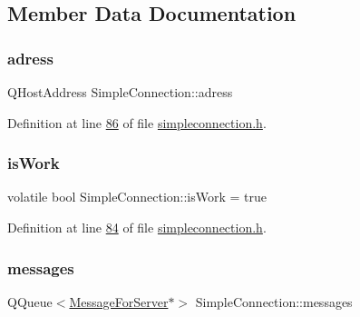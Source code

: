 \subsection{Member Data Documentation}
\mbox{\label{a00125_afd0b4e345d57b690f1a1e12c4816e268}} 
\subsubsection{\texorpdfstring{adress}{adress}}
{\footnotesize\ttfamily Q\+Host\+Address Simple\+Connection\+::adress\hspace{0.3cm}{\ttfamily [protected]}}



Definition at line \hyperlink{a00008_source_l00086}{86} of file \hyperlink{a00008_source}{simpleconnection.\+h}.

\mbox{\label{a00125_a45a1e7ba5a9538bd382d24d364d0bbe5}} 
\subsubsection{\texorpdfstring{is\+Work}{isWork}}
{\footnotesize\ttfamily volatile bool Simple\+Connection\+::is\+Work = true\hspace{0.3cm}{\ttfamily [protected]}}



Definition at line \hyperlink{a00008_source_l00084}{84} of file \hyperlink{a00008_source}{simpleconnection.\+h}.

\mbox{\label{a00125_aadfc449afe00e48e200ae5f94bc9f2f7}} 
\subsubsection{\texorpdfstring{messages}{messages}}
{\footnotesize\ttfamily Q\+Queue$<$\hyperlink{a00121}{Message\+For\+Server}$\ast$$>$ Simple\+Connection\+::messages\hspace{0.3cm}{\ttfamily [protected]}}



